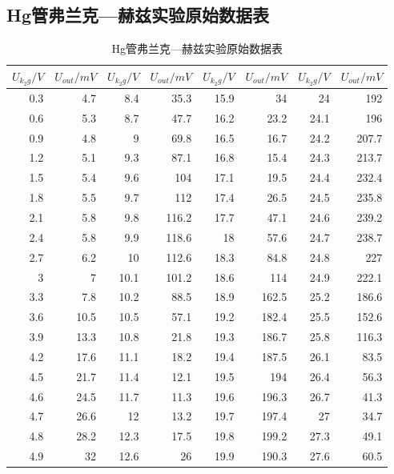 \documentclass[a4 paper,12pt]{article}
\begin{document}
\subsection{Hg管弗兰克—赫兹实验原始数据表}
\begin{center}
\begin{longtable}{||r|r||r|r||r|r||r|r||}
	\caption{Hg管弗兰克—赫兹实验原始数据表} 
    \label{Hg管弗兰克—赫兹实验原始数据表}\\
    \hline
    \hline
    $U_{k_{2}g}/V$&$U_{out}/mV$&    $U_{k_{2}g}/V$&$U_{out}/mV$&    $U_{k_{2}g}/V$&$U_{out}/mV$&    $U_{k_{2}g}/V$&$U_{out}/mV$\\
    \hline
    \hline
		0.3   & 4.7   & 8.4   & 35.3  & 15.9  & 34    & 24    & 192 \\
		0.6   & 5.3   & 8.7   & 47.7  & 16.2  & 23.2  & 24.1  & 196 \\
		0.9   & 4.8   & 9     & 69.8  & 16.5  & 16.7  & 24.2  & 207.7 \\
		1.2   & 5.1   & 9.3   & 87.1  & 16.8  & 15.4  & 24.3  & 213.7 \\
		1.5   & 5.4   & 9.6   & 104   & 17.1  & 19.5  & 24.4  & 232.4 \\
		1.8   & 5.5   & 9.7   & 112   & 17.4  & 26.5  & 24.5  & 235.8 \\
		2.1   & 5.8   & 9.8   & 116.2 & 17.7  & 47.1  & 24.6  & 239.2 \\
		2.4   & 5.8   & 9.9   & 118.6 & 18    & 57.6  & 24.7  & 238.7 \\
		2.7   & 6.2   & 10    & 112.6 & 18.3  & 84.8  & 24.8  & 227 \\
		3     & 7     & 10.1  & 101.2 & 18.6  & 114   & 24.9  & 222.1 \\
		3.3   & 7.8   & 10.2  & 88.5  & 18.9  & 162.5 & 25.2  & 186.6 \\
		3.6   & 10.5  & 10.5  & 57.1  & 19.2  & 182.4 & 25.5  & 152.6 \\
		3.9   & 13.3  & 10.8  & 21.8  & 19.3  & 186.7 & 25.8  & 116.3 \\
		4.2   & 17.6  & 11.1  & 18.2  & 19.4  & 187.5 & 26.1  & 83.5 \\
		4.5   & 21.7  & 11.4  & 12.1  & 19.5  & 194   & 26.4  & 56.3 \\
		4.6   & 24.5  & 11.7  & 11.3  & 19.6  & 196.3 & 26.7  & 41.3 \\
		4.7   & 26.6  & 12    & 13.2  & 19.7  & 197.4 & 27    & 34.7 \\
		4.8   & 28.2  & 12.3  & 17.5  & 19.8  & 199.2 & 27.3  & 49.1 \\
		4.9   & 32    & 12.6  & 26    & 19.9  & 190.3 & 27.6  & 60.5 \\

\end{longtable}
\end{center}
\end{document}
